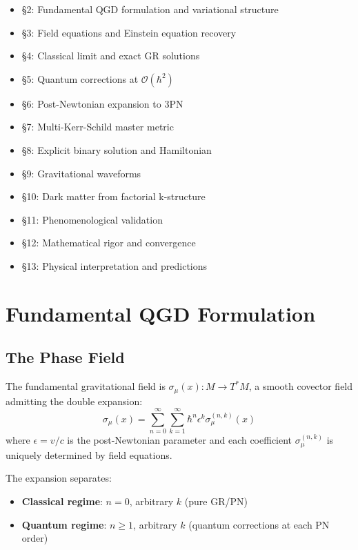 \documentclass[11pt,a4paper]{article}
\theoremstyle{definition}
\theoremstyle{remark}
\begin{document}
	\begin{itemize}
		\item §2: Fundamental QGD formulation and variational structure
		\item §3: Field equations and Einstein equation recovery
		\item §4: Classical limit and exact GR solutions
		\item §5: Quantum corrections at $\mathcal{O}(\hbar^2)$
		\item §6: Post-Newtonian expansion to 3PN
		\item §7: Multi-Kerr-Schild master metric
		\item §8: Explicit binary solution and Hamiltonian
		\item §9: Gravitational waveforms
		\item §10: Dark matter from factorial k-structure
		\item §11: Phenomenological validation
		\item §12: Mathematical rigor and convergence
		\item §13: Physical interpretation and predictions
	\end{itemize}
	
	\section{Fundamental QGD Formulation}
	
	\subsection{The Phase Field}
	
		The fundamental gravitational field is $\sigma_\mu(x): M \to T^*M$, a smooth covector field admitting the double expansion:
		\begin{equation}\label{eq:double_expansion}
			\boxed{\sigma_\mu(x) = \sum_{n=0}^\infty\sum_{k=1}^\infty \hbar^n\epsilon^k \sigma_\mu^{(n,k)}(x)}
		\end{equation}
		where $\epsilon = v/c$ is the post-Newtonian parameter and each coefficient $\sigma_\mu^{(n,k)}$ is uniquely determined by field equations.
	
	The expansion separates:
	\begin{itemize}
		\item \textbf{Classical regime}: $n=0$, arbitrary $k$ (pure GR/PN)
		\item \textbf{Quantum regime}: $n \geq 1$, arbitrary $k$ (quantum corrections at each PN order)
	\end{itemize}
	
\end{document}
